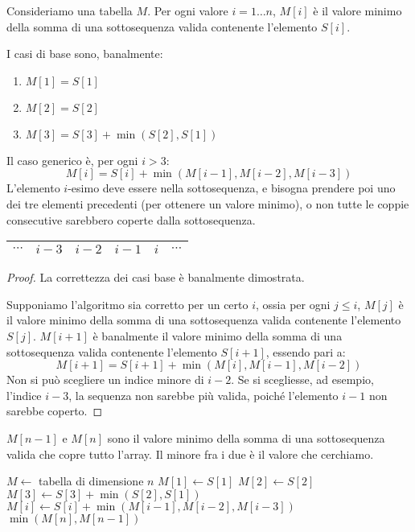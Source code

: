 Consideriamo una tabella $M$. Per ogni valore $i = 1 \ldots n$, $M[i]$ \`e il valore minimo della somma di una sottosequenza valida contenente l'elemento $S[i]$.

I casi di base sono, banalmente:
\begin{enumerate}
    \item $M[1] = S[1]$
    \item $M[2] = S[2]$
    \item $M[3] = S[3] + \min(S[2], S[1])$
\end{enumerate}
Il caso generico \`e, per ogni $i > 3$:
\[
M[i] = S[i] + \min (M[i-1], M[i-2], M[i-3])
\]
L'elemento $i$-esimo deve essere nella sottosequenza, e bisogna prendere poi uno dei tre elementi precedenti (per ottenere un valore minimo), o non tutte le coppie consecutive sarebbero coperte dalla sottosequenza.
\begin{center}
\begin{tabular}{*{5}{l|}l}
\hline
$\cdots$ & $i-3$ & $i-2$ & $i-1$ & $i$ & $\cdots$ \\
\hline 
\end{tabular}
\end{center}

\begin{proof}
La correttezza dei casi base \`e banalmente dimostrata.

Supponiamo l'algoritmo sia corretto per un certo $i$, ossia per ogni $j \le i$, $M[j]$ \`e il valore minimo della somma di una sottosequenza valida contenente l'elemento $S[j]$. $M[i+1]$ \`e banalmente il valore minimo della somma di una sottosequenza valida contenente l'elemento $S[i+1]$, essendo pari a:
\[
M[i+1] = S[i+1] + \min (M[i], M[i-1], M[i-2])
\]
Non si pu\`o scegliere un indice minore di $i-2$. Se si scegliesse, ad esempio, l'indice $i-3$, la sequenza non sarebbe pi\`u valida, poich\'e l'elemento $i-1$ non sarebbe coperto.
\end{proof}

$M[n-1]$ e $M[n]$ sono il valore minimo della somma di una sottosequenza valida che copre tutto l'array. Il minore fra i due \`e il valore che cerchiamo.

\begin{algorithm}
\begin{algorithmic}
    \State $M \gets$ tabella di dimensione $n$
    \State $M[1] \gets S[1]$
    \State $M[2] \gets S[2]$
    \State $M[3] \gets S[3] + \min(S[2], S[1])$
        \State $M[i] \gets S[i] + \min (M[i-1], M[i-2], M[i-3])$
    \EndFor
    \State \Return $\min(M[n], M[n-1])$
\EndFunction
\end{algorithmic}
\caption{\label{alg_coppie}trovare il valore minimo di una sottosequenza valida}
\end{algorithm}

